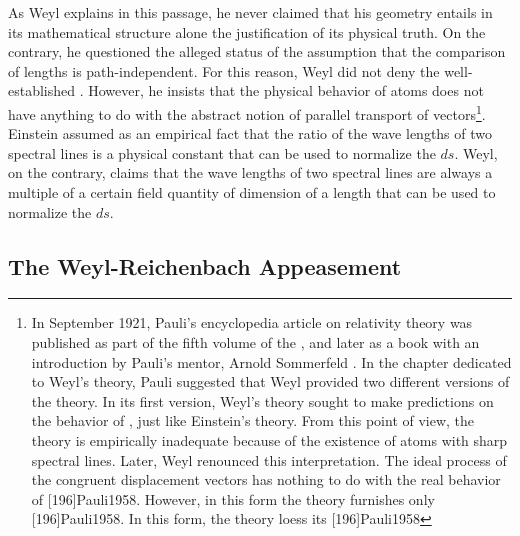 \documentclass[draft]{article}
\newcommand{\WT}{Weyl's theory\xspace}
\begin{document}
As Weyl explains in this passage, he never claimed that his geometry entails in its mathematical structure alone the \apr justification of its physical truth. On the contrary, he questioned the alleged \apr status of the assumption that the comparison of lengths is path-independent. For this reason, Weyl did not deny the well-established . However, he insists that the physical behavior of atoms does not have anything to do with the abstract notion of parallel transport of vectors\footnote{\label{pauli}In September 1921, Pauli's encyclopedia article on relativity theory was published as part of the fifth volume of the , and later as a book with an introduction by Pauli's mentor, Arnold Sommerfeld \citep{Pauli1921}. In the chapter dedicated to \WT, Pauli suggested that Weyl provided two different versions of the theory. In its first version, \WT sought to make predictions on the behavior of \rac, just like Einstein's theory. From this point of view, the theory is empirically inadequate because of the existence of atoms with sharp spectral lines. Later, Weyl renounced this interpretation. The ideal process of the congruent displacement vectors has nothing to do with the real behavior of \rac {}[196]{Pauli1958}. However, in this form the theory furnishes only  [196]{Pauli1958}. In this form, the theory loess its  [196]{Pauli1958}}. Einstein assumed as an empirical fact that the ratio of the wave lengths of two spectral lines is a  physical constant that can be used to normalize the $ds$. Weyl, on the contrary, claims that the wave lengths of two spectral lines are always a multiple of a certain field quantity of dimension of a length that can be used to normalize the $ds$. 


\subsection{The Weyl-Reichenbach Appeasement}

  
\end{document}
